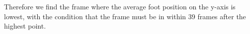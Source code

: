 

        
Therefore we find the frame where the average foot position on the y-axis is lowest, with the condition that the frame must be in within 39 frames after the highest point.